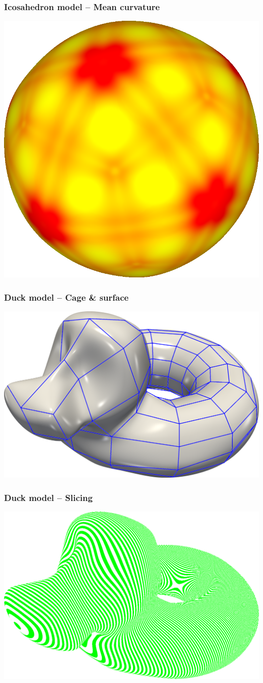\documentclass{beamer}
\begin{document}
\begin{frame}
  \frametitle{Icosahedron model -- Mean curvature}
  \centering
  \includegraphics[width=.6\textwidth]{images/icosahedron-mean.png}
\end{frame}

\begin{frame}
  \frametitle{Duck model -- Cage \& surface}
  \centering
  \includegraphics[width=.85\textwidth]{images/bob-surf.png}
\end{frame}

\begin{frame}
  \frametitle{Duck model -- Slicing}
  \centering
  \includegraphics[width=.85\textwidth]{images/bob-slicing.png}
\end{frame}
\end{document}
